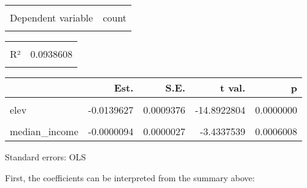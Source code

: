 \documentclass[
]{article}
\begin{document}
\begin{table}[!h]
\centering
\begin{tabular}{lr}
\toprule
\cellcolor{gray!6}{Observations} & \cellcolor{gray!6}{4391 (23 missing obs. deleted)}\\
Dependent variable & count\\
\cellcolor{gray!6}{Type} & \cellcolor{gray!6}{OLS linear regression}\\
\bottomrule
\end{tabular}
\end{table} \begin{table}[!h]
\centering
\begin{tabular}{lr}
\toprule
\cellcolor{gray!6}{F(3,4387)} & \cellcolor{gray!6}{151.4730923}\\
R² & 0.0938608\\
\cellcolor{gray!6}{Adj. R²} & \cellcolor{gray!6}{0.0932411}\\
\bottomrule
\end{tabular}
\end{table} \begin{table}[!h]
\centering
\begin{threeparttable}
\begin{tabular}{lrrrr}
\toprule
  & Est. & S.E. & t val. & p\\
\midrule
\cellcolor{gray!6}{(Intercept)} & \cellcolor{gray!6}{10.1472401} & \cellcolor{gray!6}{0.3589623} & \cellcolor{gray!6}{28.2682638} & \cellcolor{gray!6}{0.0000000}\\
elev & -0.0139627 & 0.0009376 & -14.8922804 & 0.0000000\\
\cellcolor{gray!6}{slope} & \cellcolor{gray!6}{-0.1468949} & \cellcolor{gray!6}{0.0213511} & \cellcolor{gray!6}{-6.8799698} & \cellcolor{gray!6}{0.0000000}\\
median\_income & -0.0000094 & 0.0000027 & -3.4337539 & 0.0006008\\
\bottomrule
\end{tabular}
\begin{tablenotes}
\item Standard errors: OLS
\end{tablenotes}
\end{threeparttable}
\end{table}

First, the coefficients can be interpreted from the summary above:
\end{document}
